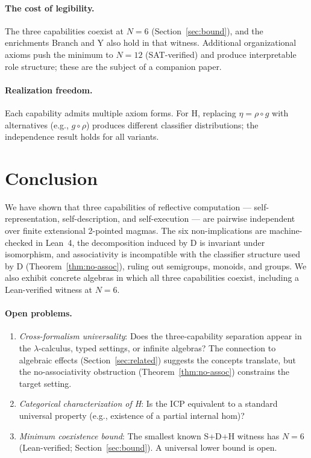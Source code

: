 \documentclass[sigconf,screen,review,anonymous]{acmart}
\begin{document}
\paragraph{The cost of legibility.}
The three capabilities coexist at $N\!=\!6$ (Section~\ref{sec:bound}), and the enrichments Branch and Y also hold in that witness. Additional organizational axioms push the minimum to $N\!=\!12$ (SAT-verified) and produce interpretable role structure; these are the subject of a companion paper.

\paragraph{Realization freedom.}
Each capability admits multiple axiom forms. For H, replacing $\eta = \rho \circ g$ with alternatives (e.g., $g \circ \rho$) produces different classifier distributions; the independence result holds for all variants.

\section{Conclusion}

We have shown that three capabilities of reflective computation — self-representation, self-description, and self-execution — are pairwise independent over finite extensional 2-pointed magmas. The six non-implications are machine-checked in Lean~4, the decomposition induced by D is invariant under isomorphism, and associativity is incompatible with the classifier structure used by D (Theorem~\ref{thm:no-assoc}), ruling out semigroups, monoids, and groups. We also exhibit concrete algebras in which all three capabilities coexist, including a Lean-verified witness at $N\!=\!6$.

\paragraph{Open problems.}
\begin{enumerate}
  \item \emph{Cross-formalism universality}: Does the three-capability separation appear in the $\lambda$-calculus, typed settings, or infinite algebras? The connection to algebraic effects (Section~\ref{sec:related}) suggests the concepts translate, but the no-associativity obstruction (Theorem~\ref{thm:no-assoc}) constrains the target setting.
  \item \emph{Categorical characterization of H}: Is the ICP equivalent to a standard universal property (e.g., existence of a partial internal hom)?
  \item \emph{Minimum coexistence bound}: The smallest known S+D+H witness has $N\!=\!6$ (Lean-verified; Section~\ref{sec:bound}). A universal lower bound is open.
\end{enumerate}
\end{document}
